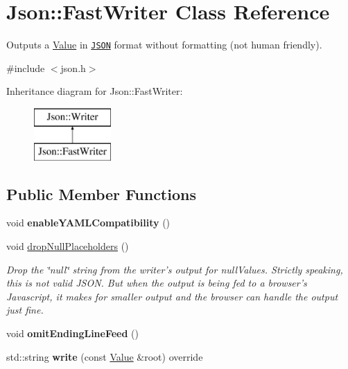 \hypertarget{class_json_1_1_fast_writer}{\section{Json\-:\-:Fast\-Writer Class Reference}
\label{class_json_1_1_fast_writer}
}


Outputs a \hyperlink{class_json_1_1_value}{Value} in \href{http://www.json.org}{\tt J\-S\-O\-N} format without formatting (not human friendly).  




{\ttfamily \#include $<$json.\-h$>$}

Inheritance diagram for Json\-:\-:Fast\-Writer\-:\begin{figure}[H]
\begin{center}
\leavevmode
\includegraphics[height=2.000000cm]{class_json_1_1_fast_writer}
\end{center}
\end{figure}
\subsection*{Public Member Functions}
\begin{DoxyCompactItemize}
\item 
\hypertarget{class_json_1_1_fast_writer_a78d98e9f76d33660ad6e6a1abe287d45}{void {\bfseries enable\-Y\-A\-M\-L\-Compatibility} ()}\label{class_json_1_1_fast_writer_a78d98e9f76d33660ad6e6a1abe287d45}

\item 
\hypertarget{class_json_1_1_fast_writer_a6e93d8dce951e408517311026a065b40}{void \hyperlink{class_json_1_1_fast_writer_a6e93d8dce951e408517311026a065b40}{drop\-Null\-Placeholders} ()}\label{class_json_1_1_fast_writer_a6e93d8dce951e408517311026a065b40}

\begin{DoxyCompactList}\small\item\em Drop the \char`\"{}null\char`\"{} string from the writer's output for null\-Values. Strictly speaking, this is not valid J\-S\-O\-N. But when the output is being fed to a browser's Javascript, it makes for smaller output and the browser can handle the output just fine. \end{DoxyCompactList}\item 
\hypertarget{class_json_1_1_fast_writer_af4ee077d365d75941fb2688d97207a55}{void {\bfseries omit\-Ending\-Line\-Feed} ()}\label{class_json_1_1_fast_writer_af4ee077d365d75941fb2688d97207a55}

\item 
\hypertarget{class_json_1_1_fast_writer_aee69e3f778982ec9218c1a5a7c6a3e7a}{std\-::string {\bfseries write} (const \hyperlink{class_json_1_1_value}{Value} \&root) override}\label{class_json_1_1_fast_writer_aee69e3f778982ec9218c1a5a7c6a3e7a}

\end{DoxyCompactItemize}


